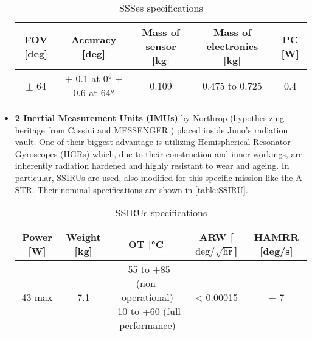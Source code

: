 \begin{itemize}
    \begin{table}[H]
        \renewcommand{\arraystretch}{1.3}
        \centering
        \small
        \begin{tabular}{|c|c|c|c|c|}
            \hline
            \textbf{FOV [deg]} & \textbf{Accuracy [deg]} & \textbf{Mass of sensor [kg]} & \textbf{Mass of electronics [kg]} & \textbf{PC [W]}\\
            \hline
            \hline
            $\pm$ 64 & \makecell{$\pm$ 0.1 at 0° \\  $\pm$ 0.6 at 64°} & 0.109 & 0.475 to 0.725 & 0.4 \\
            \hline
        \end{tabular}
        \caption{SSSes specifications}
        \label{table:sun_sensors}
    \end{table}
    \vspace*{-3mm}

    \item \textbf{2 Inertial Measurement Units (IMUs)} by Northrop (hypothesizing heritage from Cassini \cite{gyro_evaluation} and MESSENGER \cite{messenger_imu}) placed inside Juno's radiation vault. One of their biggest advantage is utilizing Hemispherical Resonator Gyroscopes (HGRs) which, due to their construction and inner workings, are inherently radiation hardened and highly resistant to wear and ageing. In particular, SSIRUs \cite{SSIRU} are used, also modified for this specific mission like the A-STR. Their nominal specifications are shown in \autoref{table:SSIRU}.
     
    \begin{table}[H]
        \renewcommand{\arraystretch}{1.3}
        \centering
        \small
        \begin{tabular}{|c|c|c|c|c|}
            \hline
            \textbf{Power [W]} & \textbf{Weight [kg]} & \textbf{OT [°C]} & \textbf{ARW [$\textrm{deg} / \sqrt{\textrm{hr}}$]} & \textbf{HAMRR [deg/s]} \\
            \hline
            \hline
            43 max & 7.1 & \makecell{-55 to +85 (non-operational) \\  -10 to +60 (full performance)} & < 0.00015 & $\pm$ 7 \\
            \hline
        \end{tabular}
        \caption{SSIRUs specifications}
        \label{table:SSIRU}
    \end{table}
\end{itemize}
\vspace*{-3mm}

